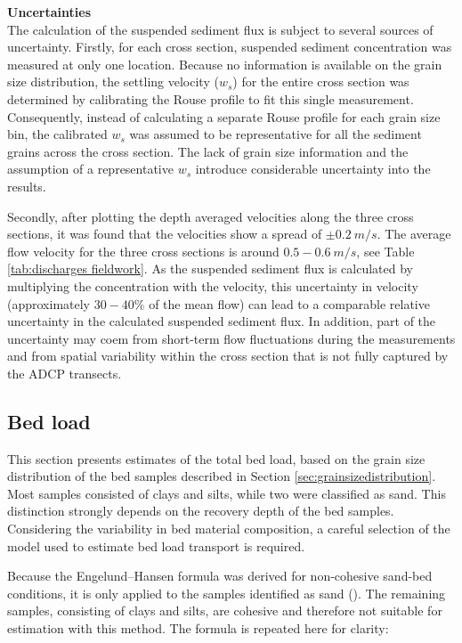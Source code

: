 \textbf{Uncertainties} \\
The calculation of the suspended sediment flux is subject to several sources of uncertainty. Firstly, for each cross section, suspended sediment concentration was measured at only one location. Because no information is available on the grain size distribution, the settling velocity ($w_s$) for the entire cross section was determined by calibrating the Rouse profile to fit this single measurement. Consequently, instead of calculating a separate Rouse profile for each grain size bin, the calibrated $w_s$ was assumed to be representative for all the sediment grains across the cross section. The lack of grain size information and the assumption of a representative $w_s$ introduce considerable uncertainty into the results.

Secondly, after plotting the depth averaged velocities along the three cross sections, it was found that the velocities show a spread of $\pm0.2~m/s$. The average flow velocity for the three cross sections is around $0.5-0.6~m/s$, see Table \ref{tab:discharges fieldwork}. As the suspended sediment flux is calculated by multiplying the concentration with the velocity, this uncertainty in velocity (approximately $30-40\%$ of the mean flow) can lead to a comparable relative uncertainty in the calculated suspended sediment flux. In addition, part of the uncertainty may coem from short-term flow fluctuations during the measurements and from spatial variability within the cross section that is not fully captured by the ADCP transects.

\subsection{Bed load}
This section presents estimates of the total bed load, based on the grain size distribution of the bed samples described in Section \ref{sec:grainsizedistribution}. Most samples consisted of clays and silts, while two were classified as sand. This distinction strongly depends on the recovery depth of the bed samples. Considering the variability in bed material composition, a careful selection of the model used to estimate bed load transport is required. 

Because the Engelund–Hansen formula was derived for non-cohesive sand-bed conditions, it is only applied to the samples identified as sand (\cite{engelundMonographSedimentTransport1967}). The remaining samples, consisting of clays and silts, are cohesive and therefore not suitable for estimation with this method. The formula is repeated here for clarity:

